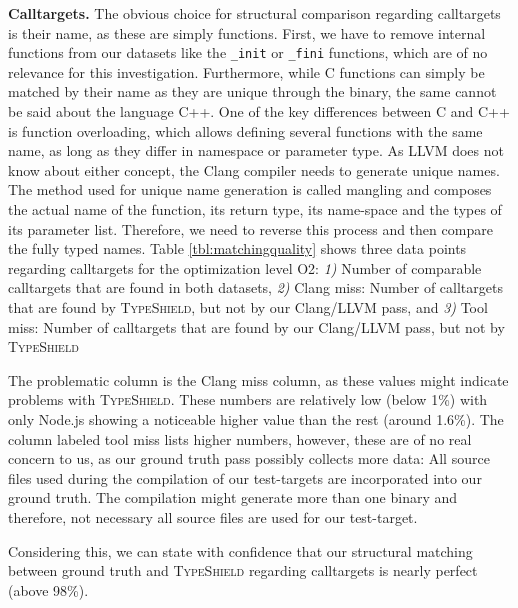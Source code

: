 \textbf{Calltargets.} The obvious choice for structural comparison regarding calltargets is their name, as these are simply functions. First, we have to remove internal functions from our datasets like the \texttt{\_init} or \texttt{\_fini} functions, which are of no relevance for this investigation. Furthermore, while C functions can simply be matched by their name as they are unique through the binary, the same cannot be said about the language C++. One of the key differences between C and C++ is function overloading, which allows defining several functions with the same name, as long as they differ in namespace or parameter type. 
As LLVM does not know about either concept, the Clang compiler needs to generate unique names. The method used for unique name generation is called mangling and composes the actual name of the function, its return type, its name-space and the types of its parameter list. Therefore, we need to reverse this process and then compare the fully typed names. Table \ref{tbl:matchingquality} shows three data points regarding calltargets for the optimization level O2:
\textit{1)} Number of comparable calltargets that are found in both datasets, 
\textit{2)} Clang miss: Number of calltargets that are found by \textsc{TypeShield}, but not by our Clang/LLVM pass, and 
\textit{3)} Tool miss: Number of calltargets that are found by our Clang/LLVM pass, but not by \textsc{TypeShield}

The problematic column is the Clang miss column, as these values might indicate problems with \textsc{TypeShield}. These numbers are relatively low (below 1\%) with only Node.js showing a noticeable higher value than the rest (around 1.6\%). The column labeled tool miss lists higher numbers, however, these are of no real concern to us, as our ground truth pass possibly collects more data: All source files used during the compilation of our test-targets are incorporated into our ground truth. The compilation might generate more than one binary and therefore, not necessary all source files are used for our test-target.

Considering this, we can state with confidence that our structural matching between ground truth and \textsc{TypeShield} regarding calltargets is nearly perfect (above 98\%).


